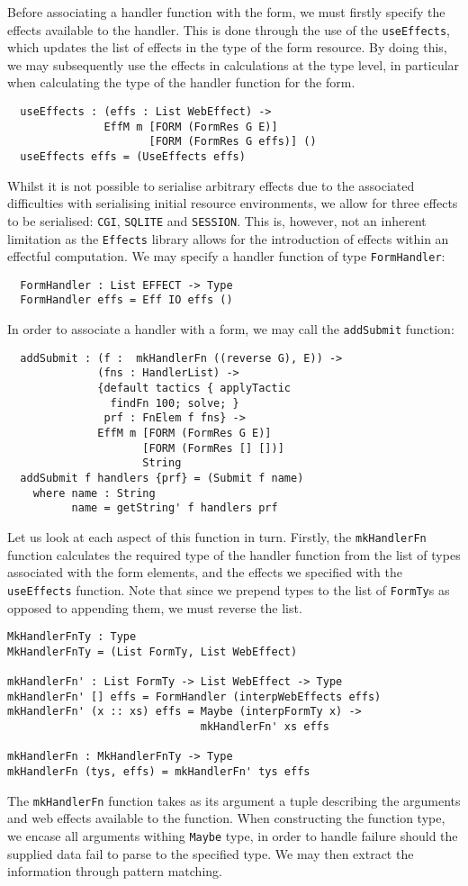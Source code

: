 \documentclass[preprint]{sigplanconf}
\begin{document}
Before associating a handler function with the form, we must firstly specify the effects available to the handler. This is done through the use of the \texttt{useEffects}, which updates the list of effects in the type of the form resource. By doing this, we may subsequently use the effects in calculations at the type level, in particular when calculating the type of the handler function for the form. 
{\small
\begin{verbatim}
  useEffects : (effs : List WebEffect) ->
               EffM m [FORM (FormRes G E)] 
                      [FORM (FormRes G effs)] ()
  useEffects effs = (UseEffects effs)
\end{verbatim}}
Whilst it is not possible to serialise arbitrary effects due to the associated difficulties with serialising initial resource environments, we allow for three effects to be serialised: \texttt{CGI}, \texttt{SQLITE} and \texttt{SESSION}. This is, however, not an inherent limitation as the \texttt{Effects} library allows for the introduction of effects within an effectful computation.
%
We may specify a handler function of type \texttt{FormHandler}:
{\small
\begin{verbatim}
  FormHandler : List EFFECT -> Type
  FormHandler effs = Eff IO effs ()
\end{verbatim}
}
In order to associate a handler with a form, we may call the \texttt{addSubmit} function:
{\small
\begin{verbatim}
  addSubmit : (f :  mkHandlerFn ((reverse G), E)) ->
              (fns : HandlerList) ->
              {default tactics { applyTactic 
                findFn 100; solve; }
               prf : FnElem f fns} ->
              EffM m [FORM (FormRes G E)]
                     [FORM (FormRes [] [])] 
                     String
  addSubmit f handlers {prf} = (Submit f name)
    where name : String
          name = getString' f handlers prf          
\end{verbatim}
}
Let us look at each aspect of this function in turn. Firstly, the \texttt{mkHandlerFn} function calculates the required type of the handler function from the list of types associated with the form elements, and the effects we specified with the \texttt{useEffects} function. Note that since we prepend types to the list of \texttt{FormTy}s as opposed to appending them, we must reverse the list.
{\small
\begin{verbatim}
MkHandlerFnTy : Type
MkHandlerFnTy = (List FormTy, List WebEffect)

mkHandlerFn' : List FormTy -> List WebEffect -> Type
mkHandlerFn' [] effs = FormHandler (interpWebEffects effs) 
mkHandlerFn' (x :: xs) effs = Maybe (interpFormTy x) -> 
                              mkHandlerFn' xs effs 

mkHandlerFn : MkHandlerFnTy -> Type 
mkHandlerFn (tys, effs) = mkHandlerFn' tys effs 
\end{verbatim}
}
The \texttt{mkHandlerFn} function takes as its argument a tuple describing the arguments and web effects available to the function. When constructing the function type, we encase all arguments withing \texttt{Maybe} type, in order to handle failure should the supplied data fail to parse to the specified type. We may then extract the information through pattern matching.
\end{document}
